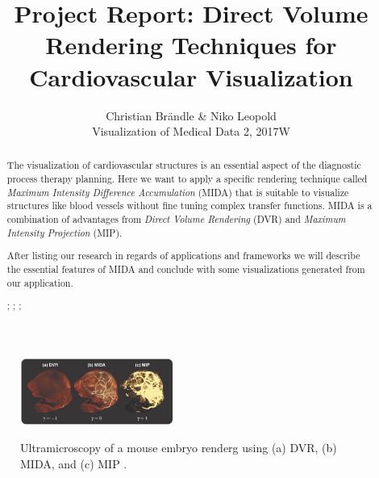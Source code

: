 \documentclass{egpubl}
\title{Project Report: Direct Volume Rendering Techniques for Cardiovascular Visualization}
\author{Christian Br{\"a}ndle \& Niko Leopold \\ Visualization of Medical Data 2, 2017W}
\begin{document}
\graphicspath{{images/}}

\maketitle


\begin{abstract}
	The visualization of cardiovascular structures is an essential aspect of the diagnostic process therapy planning.
	Here we want to apply a specific rendering technique called \emph{Maximum Intensity Difference Accumulation} (MIDA) \cite{bruckner2009instant} that is suitable to visualize structures like blood vessels without fine tuning complex transfer functions. MIDA is a combination of advantages from \emph{Direct Volume Rendering} (DVR) and \emph{Maximum Intensity Projection} (MIP).
	
	After listing our research in regards of applications and frameworks we will describe the essential features of MIDA and conclude with some visualizations generated from our application. 
		
	\begin{classification} %
		;
		;
		;
	\end{classification}
	
\end{abstract}


\begin{figure}[h]
	\centering
	\includegraphics[width=0.45\textwidth]{MIDA_MouseEmbryo_II.png} \\
	\caption{ Ultramicroscopy of a mouse embryo renderg using (a) DVR, (b) MIDA, and (c) MIP \cite{bruckner2009instant}.}
	\label{fig:MIDA_MouseEmbryo_II}
\end{figure}
\end{document}
